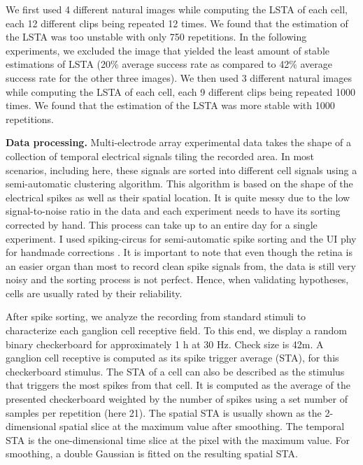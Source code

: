 We first used 4 different natural images while computing the LSTA of each cell,
each 12 different clips being repeated 12 times. We found that the estimation
of the LSTA was too unstable with only 750 repetitions. In the following
experiments, we excluded the image that yielded the least amount of stable
estimations of LSTA (20\% average success rate as compared to 42\% average
success rate for the other three images). We then used 3 different natural
images while computing the LSTA of each cell, each 9 different clips being
repeated 1000 times. We found that the estimation of the LSTA was more stable
with 1000 repetitions.

\textbf{Data processing.}
Multi-electrode array experimental data takes the shape of a collection of
temporal electrical signals tiling the recorded area.
In most scenarios, including here, these signals are sorted into different cell
signals using a semi-automatic clustering algorithm. This algorithm is based on
the shape
of the electrical spikes as well as their spatial location. It is
quite messy due to the low signal-to-noise ratio in the data and each
experiment needs to have its sorting corrected by hand.
This process can take up to an
entire day for a single experiment. I used spiking-circus for semi-automatic
spike sorting and the UI phy for handmade corrections \citep{yger_spike_2018}.
It is important to note that even though the retina is an easier organ than
most to record clean spike signals from, the data is still very noisy and the
sorting process is not perfect. Hence, when validating hypotheses, cells are
usually rated by their reliability.

After spike sorting, we analyze the recording from standard stimuli to
characterize each
ganglion cell receptive field. To this end, we display a random binary
checkerboard for approximately 1 h at 30 Hz. Check size is 42\textmu m. A
ganglion cell receptive is computed as its spike trigger average (STA), for
this checkerboard stimulus. The STA of a cell can also be described as the
stimulus that triggers the most spikes from that cell. It is computed as the
average of the presented checkerboard weighted by the number of spikes using a
set number of samples per repetition (here 21). The spatial STA is usually
shown as the 2-dimensional spatial slice at the maximum value after smoothing.
The temporal STA is the one-dimensional time slice at the pixel with the
maximum
value. For smoothing, a double Gaussian is fitted on the resulting spatial
STA.

